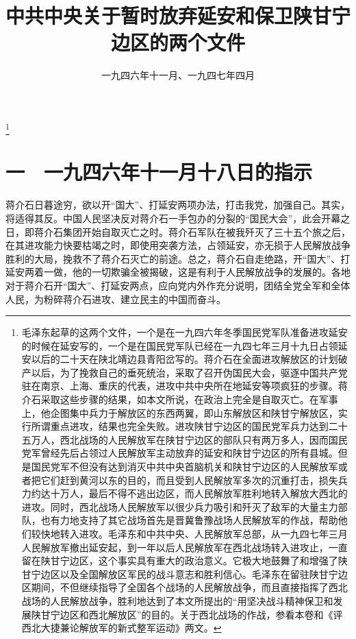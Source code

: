 
\title{中共中央关于暂时放弃延安和保卫陕甘宁边区的两个文件}
\date{一九四六年十一月、一九四七年四月}
\thanks{毛泽东起草的这两个文件，一个是在一九四六年冬季国民党军队准备进攻延安的时候在延安写的，一个是在国民党军队已经在一九四七年三月十九日占领延安以后的二十天在陕北靖边县青阳岔写的。蒋介石在全面进攻解放区的计划破产以后，为了挽救自己的垂死统治，采取了召开伪国民大会，驱逐中国共产党驻在南京、上海、重庆的代表，进攻中共中央所在地延安等项疯狂的步骤。蒋介石采取这些步骤的结果，如本文所说，在政治上完全是自取灭亡。在军事上，他企图集中兵力于解放区的东西两翼，即山东解放区和陕甘宁解放区，实行所谓重点进攻，结果也完全失败。进攻陕甘宁边区的国民党军兵力达到二十五万人，西北战场的人民解放军在陕甘宁边区的部队只有两万多人，因而国民党军曾经先后占领过人民解放军主动放弃的延安和陕甘宁边区的所有县城。但是国民党军不但没有达到消灭中共中央首脑机关和陕甘宁边区的人民解放军或者把它们赶到黄河以东的目的，而且受到人民解放军多次的沉重打击，损失兵力约达十万人，最后不得不逃出边区，而人民解放军胜利地转入解放大西北的进攻。同时，西北战场人民解放军以很少兵力吸引和歼灭了敌军的大量主力部队，也有力地支持了其它战场首先是晋冀鲁豫战场人民解放军的作战，帮助他们较快地转入进攻。毛泽东和中共中央、人民解放军总部，从一九四七年三月人民解放军撤出延安起，到一年以后人民解放军在西北战场转入进攻止，一直留在陕甘宁边区，这个事实具有重大的政治意义。它极大地鼓舞了和增强了陕甘宁边区以及全国解放区军民的战斗意志和胜利信心。毛泽东在留驻陕甘宁边区期间，不但继续指导了全国各个战场的人民解放战争，而且直接指挥了西北战场的人民解放战争，胜利地达到了本文所提出的“用坚决战斗精神保卫和发展陕甘宁边区和西北解放区”的目的。关于西北战场的作战，参看本卷和《评西北大捷兼论解放军的新式整军运动》两文。}
\maketitle


\section{一　一九四六年十一月十八日的指示}

蒋介石日暮途穷，欲以开“国大”、打延安两项办法，打击我党，加强自己。其实，将适得其反。中国人民坚决反对蒋介石一手包办的分裂的“国民大会”，此会开幕之日，即蒋介石集团开始自取灭亡之时。蒋介石军队在被我歼灭了三十五个旅之后，在其进攻能力快要枯竭之时，即使用突袭方法，占领延安，亦无损于人民解放战争胜利的大局，挽救不了蒋介石灭亡的前途。总之，蒋介石自走绝路，开“国大”、打延安两着一做，他的一切欺骗全被揭破，这是有利于人民解放战争的发展的。各地对于蒋介石开“国大”、打延安两点，应向党内外作充分说明，团结全党全军和全体人民，为粉碎蒋介石进攻、建立民主的中国而奋斗。

